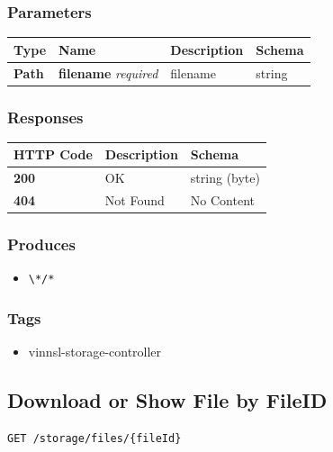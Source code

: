 \subsubsection{Parameters}\label{parameters-13}

\begin{longtable}[]{@{}llll@{}}
\toprule
Type & Name & Description & Schema\tabularnewline
\midrule
\endhead
\textbf{Path} & \textbf{filename} \emph{required} & filename &
string\tabularnewline
\bottomrule
\end{longtable}

\subsubsection{Responses}\label{responses-17}

\begin{longtable}[]{@{}lll@{}}
\toprule
HTTP Code & Description & Schema\tabularnewline
\midrule
\endhead
\textbf{200} & OK & string (byte)\tabularnewline
\textbf{404} & Not Found & No Content\tabularnewline
\bottomrule
\end{longtable}

\subsubsection{Produces}\label{produces-17}

\begin{itemize}
\tightlist
\item
  \texttt{\textbackslash{}*/*}
\end{itemize}

\subsubsection{Tags}\label{tags-17}

\begin{itemize}
\tightlist
\item
  vinnsl-storage-controller
\end{itemize}

\subsection{Download or Show File by
FileID}\label{download-or-show-file-by-fileid}

\begin{verbatim}
GET /storage/files/{fileId}
\end{verbatim}

